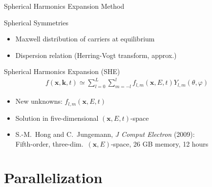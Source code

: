 \documentclass[usepdftitle=false,handout,10pt]{beamer}
\renewcommand{\vector}[1]{\boldsymbol{#1}}
\begin{document}
\begin{frame}{Spherical Harmonics Expansion Method}

 \vspace*{-0.3cm}
  \begin{block}{Spherical Symmetries}
  \begin{itemize}
   \item Maxwell distribution of carriers at equilibrium
   \item Dispersion relation (Herring-Vogt transform, approx.)
  \end{itemize}
  \end{block}

 
     \vspace*{0.62cm}
  \begin{block}{Spherical Harmonics Expansion (SHE)}
     \vspace*{-0.5cm}
      { %
       \begin{align*}
	f(\vector x, \vector k, t) \simeq \sum_{l = 0}^L \sum_{m=-l}^l f_{l,m}(\vector x, E, t) Y_{l,m}(\theta, \varphi)
      \end{align*}}
     \vspace*{-0.5cm}
    \begin{itemize}
     \item New unknowns: $f_{l,m}(\vector x, E, t)$
     \item Solution in five-dimensional $(\vector x, E, t)$-space
     \item S.-M.~Hong and C.~Jungemann, \textit{J Comput Electron} (2009): \\
           Fifth-order, three-dim.~$(\vector x, E)$-space, 26 GB memory, 12 hours
    \end{itemize}
   \end{block}


\end{frame}




%
%

\section{Parallelization}
\end{document}
